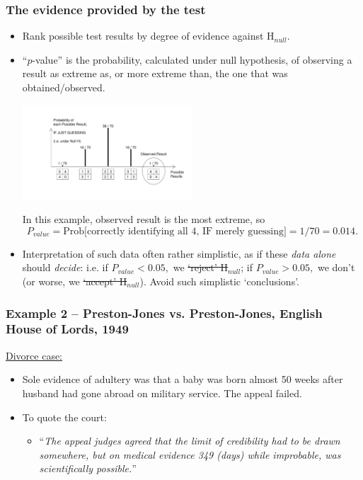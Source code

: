 \documentclass[handout]{beamer}\usepackage[]{graphicx}\usepackage[]{color}
\begin{document}
\begin{frame}
\frametitle{The evidence provided by the test}

\begin{footnotesize}
\begin{itemize}
\item
Rank possible test
results by  degree of evidence against H$_{null}$. 
\item ``$p$-value'' is the probability, calculated under null hypothesis, of
observing a result as  extreme as, or more extreme than, the one that was obtained/observed.
\begin{center}
	\includegraphics[width=2.5in]{ProbResults.pdf}
\end{center}
\pause
In this example, observed result is the most extreme, so
$$P_{value}=\textrm{Prob[correctly identifying all 4, IF merely guessing]} = 1/70 = 0.014.$$ \pause
\item
Interpretation of such data  often  rather simplistic, as if these \textit{data alone} should \textit{decide}:  i.e. if $P_{value} < 0.05,$ we \sout{`reject' H}$_{null}$; if $P_{value} > 0.05,$ we don't (or worse, we \sout{`accept' H}$_{null}$). Avoid such simplistic `conclusions'.

\end{itemize}
\end{footnotesize}
\end{frame}

\begin{frame}
\frametitle{Example 2 -- Preston-Jones vs. Preston-Jones, English House of Lords, 1949}

\underline{Divorce case:}

\vspace*{.3in}

\begin{itemize}
	\item Sole evidence of adultery was that a baby was born almost 50 weeks after husband had gone abroad on military service.  The appeal failed.
	\item To quote the court: 
	\begin{itemize}
		\item ``\textit{The appeal judges agreed that the limit of credibility had to be drawn somewhere, but on medical 
evidence 349 (days) while improbable, was scientifically possible.}''
	\end{itemize}
\end{itemize}



\end{frame}
\end{document}
